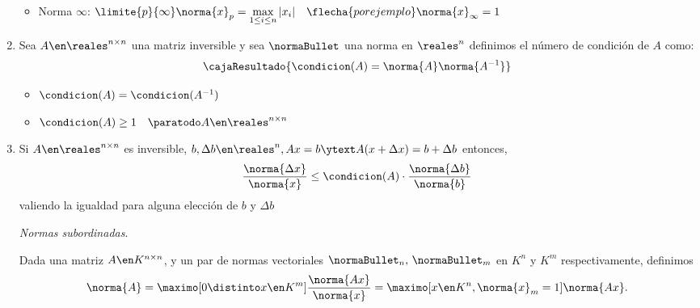 \begin{enumerate}[label=\tiny\purple{\faIcon{snowman}}]
\begin{itemize}
          \item Norma $\infty$:
                $\limite{p}{\infty} \norma{x}_p = \max\limits_{1\leq i \leq n} |x_i|
                  \quad
                  \flecha{por ejemplo}
                  \norma{x}_{\infty} = 1 \quad$
        \end{itemize}

  \item Sea $A \en \reales^{n \times n}$ una matriz inversible y sea $\normaBullet$ una norma en
        $\reales^n$ definimos el número de condición de $A$ como:
        $$
          \cajaResultado{
            \condicion(A) = \norma{A}\norma{A^{-1}}
          }
        $$
        \begin{itemize}
          \item $\condicion(A) = \condicion(A^{-1})$
          \item $\condicion(A) \geq 1 \quad \paratodo A \en \reales^{n \times n}$
        \end{itemize}
  \item Si $A \en \reales^{n \times n}$ es inversible, $b, \Delta b \en \reales^{n}, Ax = b \ytext A(x + \Delta x) = b + \Delta b$ entonces,
        $$
          \frac{\norma{\Delta x}}{\norma{x}} \leq \condicion(A) \cdot \frac{\norma{\Delta b}}{\norma{b}}
        $$
        valiendo la igualdad para alguna elección de $b$ y $\Delta b$

        \textit{Normas subordinadas}.

        Dada una matriz $A \en K^{n \times n}$, y un par de normas vectoriales $\normaBullet_n,\, \normaBullet_m$ en $K^n$ y $K^m$
        respectivamente, definimos
        $$
          \norma{A} =
          \maximo[0 \distinto x\en K^m] \frac{ \norma{Ax}}{\norma{x}} =
          \maximo[x \en K^n, \norma{x}_m = 1] \norma{Ax}.
        $$


\end{enumerate}
